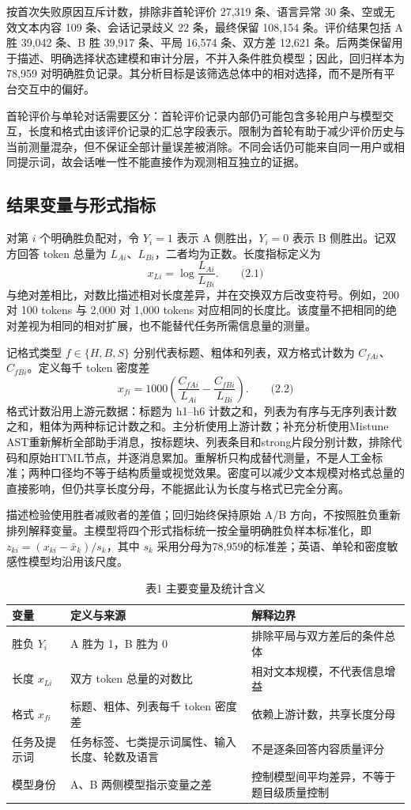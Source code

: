 \documentclass[UTF8,11pt,a4paper,fontset=windows]{ctexart}
\numberwithin{equation}{section}
\begin{document}
按首次失败原因互斥计数，排除非首轮评价 27,319 条、语言异常 30 条、空或无效文本内容 109 条、会话记录歧义 22 条，最终保留 108,154 条。评价结果包括 A 胜 39,042 条、B 胜 39,917 条、平局 16,574 条、双方差 12,621 条。后两类保留用于描述、明确选择状态建模和审计分层，不并入条件胜负模型；因此，回归样本为 78,959 对明确胜负记录。其分析目标是该筛选总体中的相对选择，而不是所有平台交互中的偏好。

首轮评价与单轮对话需要区分：首轮评价记录内部仍可能包含多轮用户与模型交互，长度和格式由该评价记录的汇总字段表示。限制为首轮有助于减少评价历史与当前测量混杂，但不保证全部计量误差被消除。不同会话仍可能来自同一用户或相同提示词，故会话唯一性不能直接作为观测相互独立的证据。

\subsection{结果变量与形式指标}
对第 $i$ 个明确胜负配对，令 $Y_i=1$ 表示 A 侧胜出，$Y_i=0$ 表示 B 侧胜出。记双方回答 token 总量为 $L_{Ai}$、$L_{Bi}$，二者均为正数。长度指标定义为
\[x_{Li}=\log\frac{L_{Ai}}{L_{Bi}}.\qquad\text{(2.1)}\]
与绝对差相比，对数比描述相对长度差异，并在交换双方后改变符号。例如，200 对 100 tokens 与 2,000 对 1,000 tokens 对应相同的长度比。该度量不把相同的绝对差视为相同的相对扩展，也不能替代任务所需信息量的测量。

记格式类型 $f\in\{H,B,S\}$ 分别代表标题、粗体和列表，双方格式计数为 $C_{fAi}$、$C_{fBi}$。定义每千 token 密度差
\[x_{fi}=1000\left(\frac{C_{fAi}}{L_{Ai}}-\frac{C_{fBi}}{L_{Bi}}\right).\qquad\text{(2.2)}\]
格式计数沿用上游元数据：标题为 h1--h6 计数之和，列表为有序与无序列表计数之和，粗体为两种标记计数之和。主分析使用上游计数；补充分析使用Mistune AST重新解析全部助手消息，按标题块、列表条目和strong片段分别计数，排除代码和原始HTML节点，并逐消息累加。重解析只构成替代测量，不是人工金标准；两种口径均不等于结构质量或视觉效果。密度可以减少文本规模对格式总量的直接影响，但仍共享长度分母，不能据此认为长度与格式已完全分离。

描述检验使用胜者减败者的差值；回归始终保持原始 A/B 方向，不按照胜负重新排列解释变量。主模型将四个形式指标统一按全量明确胜负样本标准化，即 $z_{ki}=(x_{ki}-\bar x_k)/s_k$，其中 $s_k$ 采用分母为78,959的标准差；英语、单轮和密度敏感性模型均沿用该尺度。

\begin{table}[htbp]\centering\small
\caption{表1 主要变量及统计含义}\label{tab:vars}
\begin{tabular}{lll}
\toprule
变量 & 定义与来源 & 解释边界\\
\midrule
胜负 $Y_i$ & A 胜为 1，B 胜为 0 & 排除平局与双方差后的条件总体\\
长度 $x_{Li}$ & 双方 token 总量的对数比 & 相对文本规模，不代表信息增益\\
格式 $x_{fi}$ & 标题、粗体、列表每千 token 密度差 & 依赖上游计数，共享长度分母\\
任务及提示词 & 任务标签、七类提示词属性、输入长度、轮数及语言 & 不是逐条回答内容质量评分\\
模型身份 & A、B 两侧模型指示变量之差 & 控制模型间平均差异，不等于题目级质量控制\\
\bottomrule
\end{tabular}
\end{table}
\end{document}
